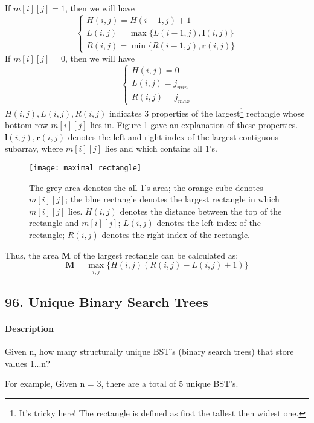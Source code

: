 If $m[i][j]=1$, then we will have
\begin{equation*}
\begin{cases}
H(i,j)=H(i-1,j)+1\\
L(i,j)=\max\{L(i-1,j),\bm{l}(i,j)\}\\
R(i,j)=\min\{R(i-1,j),\bm{r}(i,j)\}
\end{cases}
\end{equation*}
If $m[i][j]=0$, then we will have
\begin{equation*}
\begin{cases}
H(i,j)=0\\
L(i,j)=j_{min}\\
R(i,j)=j_{max}
\end{cases}
\end{equation*}
$H(i,j),L(i,j),R(i,j)$ indicates $3$ properties of the largest\footnote{It's tricky here! The rectangle is defined as first the tallest then widest one.} rectangle whose bottom row $m[i][j]$ lies in. Figure \ref{fig:maximal_rectangle} gave an explanation of these properties.
$\bm{l}(i,j),\bm{r}(i,j)$ denotes the left and right index of the largest contiguous subarray, where $m[i][j]$ lies and which contains all 1's.
\begin{figure}[ht]
    \centering
    \texttt{[image: maximal\_rectangle]}
    \caption{The grey area denotes the all 1's area; the orange cube denotes $m[i][j]$; the blue rectangle denotes the largest rectangle in which $m[i][j]$ lies. $H(i,j)$ denotes the distance between the top of the rectangle and $m[i][j]$; $L(i,j)$ denotes the left index of the rectangle; $R(i,j)$ denotes the right index of the rectangle.}
    \label{fig:maximal_rectangle}
\end{figure}

Thus, the area $\bm{M}$ of the largest rectangle can be calculated as:
$$\bm{M}=\max_{i,j}\{H(i,j)(R(i,j)-L(i,j)+1)\}$$

\subsection{96. Unique Binary Search Trees}

\paragraph{Description}

Given n, how many structurally unique BST's (binary search trees) that store values 1...n?

For example,
Given n = 3, there are a total of 5 unique BST's.

